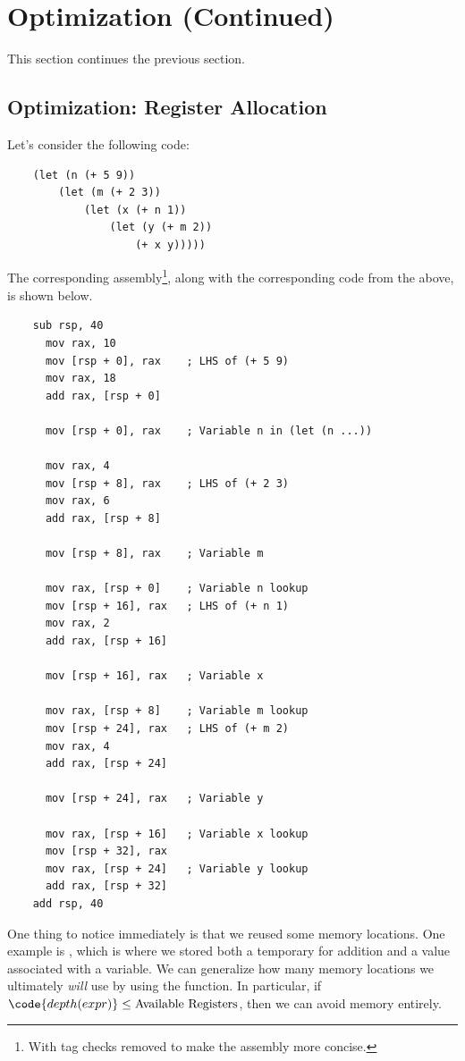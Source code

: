 \documentclass[letterpaper]{article}
\begin{document}
\section{Optimization (Continued)}
This section continues the previous section.

\subsection{Optimization: Register Allocation}
Let's consider the following code: 
\begin{verbatim}
    (let (n (+ 5 9))
        (let (m (+ 2 3))
            (let (x (+ n 1))
                (let (y (+ m 2))
                    (+ x y)))))\end{verbatim}

The corresponding assembly\footnote{With tag checks removed to make the assembly more concise.}, along with the corresponding code from the above, is shown below.
\begin{verbatim}
    sub rsp, 40
      mov rax, 10
      mov [rsp + 0], rax    ; LHS of (+ 5 9)
      mov rax, 18
      add rax, [rsp + 0]

      mov [rsp + 0], rax    ; Variable n in (let (n ...))

      mov rax, 4
      mov [rsp + 8], rax    ; LHS of (+ 2 3)
      mov rax, 6
      add rax, [rsp + 8]

      mov [rsp + 8], rax    ; Variable m

      mov rax, [rsp + 0]    ; Variable n lookup 
      mov [rsp + 16], rax   ; LHS of (+ n 1)
      mov rax, 2
      add rax, [rsp + 16]

      mov [rsp + 16], rax   ; Variable x

      mov rax, [rsp + 8]    ; Variable m lookup 
      mov [rsp + 24], rax   ; LHS of (+ m 2)
      mov rax, 4
      add rax, [rsp + 24]

      mov [rsp + 24], rax   ; Variable y 

      mov rax, [rsp + 16]   ; Variable x lookup 
      mov [rsp + 32], rax
      mov rax, [rsp + 24]   ; Variable y lookup 
      add rax, [rsp + 32]
    add rsp, 40\end{verbatim}
One thing to notice immediately is that we reused some memory locations. One example is \code{[rsp + 8]}, which is where we stored both a temporary for addition and a value associated with a variable. We can generalize how many memory locations we ultimately \emph{will} use by using the  function. In particular, if $\code{depth(expr)} \leq \text{Available Registers}$, then we can avoid memory entirely.
\end{document}
